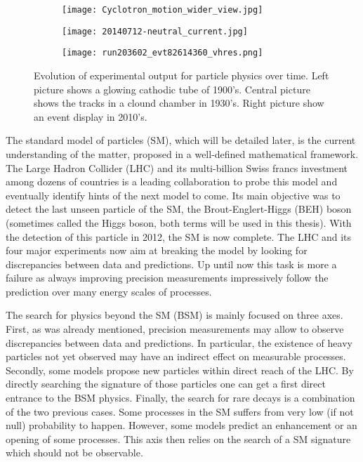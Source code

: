 \begin{figure}
\begin{subfigure}[t]{0.32\linewidth}
\begin{center}
\texttt{[image: Cyclotron\_motion\_wider\_view.jpg]}
\end{center}
\end{subfigure}
\begin{subfigure}[t]{0.32\linewidth}
\begin{center}
\texttt{[image: 20140712-neutral\_current.jpg]}
\end{center}
\end{subfigure}
\begin{subfigure}[t]{0.32\linewidth}
\begin{center}
\texttt{[image: run203602\_evt82614360\_vhres.png]}
\end{center}
\end{subfigure}
\caption{\label{org9494af2}
Evolution of experimental output for particle physics over time. Left picture shows a glowing cathodic tube of 1900's. Central picture shows the tracks in a clound chamber in 1930's. Right picture show an event display in 2010's.}
\end{figure}


The standard model of particles (SM), which will be detailed later, is the current understanding of the matter, proposed in a well-defined mathematical framework.
The Large Hadron Collider (LHC) and its multi-billion Swiss francs investment among dozens of countries is a leading collaboration to probe this model and eventually identify hints of the next model to come.
Its main objective was to detect the last unseen particle of the SM, the Brout-Englert-Higgs (BEH) boson (sometimes called the Higgs boson, both terms will be used in this thesis).
With the detection of this particle in 2012, the SM is now complete.
The LHC and its four major experiments now aim at breaking the model by looking for discrepancies between data and predictions.
Up until now this task is more a failure as always improving precision measurements impressively follow the prediction over many energy scales of processes.


The search for physics beyond the SM (BSM) is mainly focused on three axes.
First, as was already mentioned, precision measurements may allow to observe discrepancies between data and predictions.
In particular, the existence of heavy particles not yet observed may have an indirect effect on measurable processes.
Secondly, some models propose new particles within direct reach of the LHC.
By directly searching the signature of those particles one can get a first direct entrance to the BSM physics.
Finally, the search for rare decays is a combination of the two previous cases.
Some processes in the SM suffers from very low (if not null) probability to happen.
However, some models predict an enhancement or an opening of some processes.
This axis then relies on the search of a SM signature which should not be observable.


